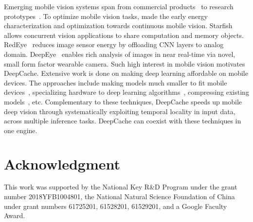 \documentclass[10pt,acmtog]{acmart}
\newcommand{\framework}{DeepCache\xspace}
\newcommand{\sys}{\framework{}}
\begin{document}
Emerging mobile vision systems span from commercial products~\cite{GoogleTranslate,amazon} to research prototypes~\cite{conf/ica3pp/OuLSE17,conf/mobisys/ZhuYZZ17,conf/cvpr/DasDWWSS17,conf/huc/HodgesWBISBSKW06,conf/mobisys/ZengCZ17,conf/mobisys/JainMC15,hwang2017raven}.
To optimize mobile vision tasks,
\cite{conf/mobisys/LiKamWaPPZB13,likamwa2013energy} made the early energy characterization and optimization towards continuous mobile vision.
Starfish~\cite{conf/mobisys/LiKamWaZ15} allows concurrent vision applications to share computation and memory objects.
RedEye~\cite{conf/isca/LiKamWaHGPZ16} reduces image sensor energy by offloading CNN layers to analog domain. %
DeepEye~\cite{conf/mobisys/MathurLBBFK17} enables rich analysis of images in near real-time via novel, small form factor wearable camera. 
Such high interest in mobile vision motivates \sys{}. 
Extensive work is done on making deep learning affordable on mobile devices.
The approaches include making models much smaller to fit mobile devices~\cite{conf/huc/LaneGQ15,conf/icassp/ChenPH14,conf/icassp/VarianiLMMG14,MobileNet},
specializing hardware to deep learning algorithms~\cite{conf/asplos/ChenDSWWCT14,conf/fpga/ZhangLSGXC15,conf/isca/ChenES16,conf/isca/HanLMPPHD16},
compressing existing models~\cite{conf/mobisys/KatevasLPS17,conf/ipsn/LaneBGFJQK16,conf/cvpr/WuLWHC16,conf/nips/DentonZBLF14,conf/mobisys/HanSPAWK16,yao2017deepiot}, etc.
Complementary to these techniques, \framework speeds up mobile deep vision through systematically exploiting temporal locality in input data, across multiple inference tasks.
\sys{} can coexist with these techniques in one engine.

\section*{Acknowledgment}
This work was supported by the National Key R\&D Program under the grant number 2018YFB1004801, the National Natural Science Foundation of China under grant numbers 61725201, 61528201, 61529201, and a Google Faculty Award. 


\balance

\end{document}
